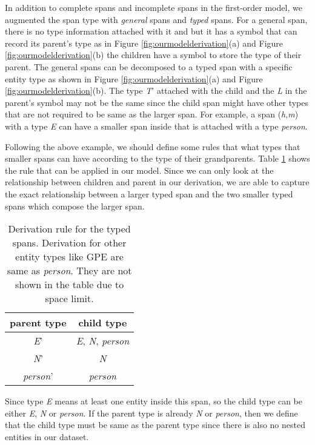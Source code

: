 In addition to complete spans and incomplete spans in the first-order model, we augmented the span type with \textit{general} spans and \textit{typed} spans. 
For a general span, there is no type information attached with it and but it has a symbol that can record its parent's type as in Figure \ref{fig:ourmodelderivation}(a) and Figure \ref{fig:ourmodelderivation}(b) the children have a symbol to store the type of their parent. 
The general spans can be decomposed to a typed span with a specific entity type as shown in Figure \ref{fig:ourmodelderivation}(a) and Figure \ref{fig:ourmodelderivation}(b). The type \textit{T}' attached with the child and the \textit{L} in the parent's symbol may not be the same since the child span might have other types that are not required to be same as the larger span. 
For example, a span (\textit{h},\textit{m}) with a type \textit{E} can have a smaller span inside that is attached with a type \textit{person}. 

Following the above example, we should define some rules that what types that smaller spans can have according to the type of their grandparents. Table \ref{tab:typerule} shows the rule that can be applied in our model. Since we can only look at the relationship between children and parent in our derivation, we are able to capture the exact relationship between a larger typed span and the two smaller typed spans which compose the larger span. 
\begin{table}[h]
	\centering
	\begin{tabular}{cc}
		\toprule
		parent type & child type \\   \midrule
		\textit{E}' & \textit{E}, \textit{N}, \textit{person}\\ 
		\textit{N}' & \textit{N}\\
		\textit{person}' & \textit{person}\\ 
		\bottomrule
	\end{tabular}
	\caption{Derivation rule for the typed spans. Derivation for other entity types like GPE are same as \textit{person}. They are not shown in the table due to space limit.}
	\label{tab:typerule}
\end{table}
Since type \textit{E} means at least one entity inside this span, so the child type can be either \textit{E}, \textit{N} or \textit{person}. If the parent type is already \textit{N} or \textit{person}, then we define that the child type must be same as the parent type since there is also no nested entities in our dataset. 

